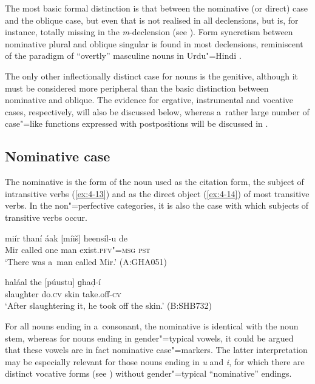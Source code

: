 The most basic formal distinction is that between the nominative (or direct) case and the oblique case, but even that is not realised in all declensions, but is, for instance, totally missing in the \textit{m}-declension (see ). Form syncretism \citep[27]{matthews1991} between nominative plural and oblique singular is found in most declensions, reminiscent of the paradigm of ``overtly'' masculine nouns in Urdu"=Hindi \citep[1]{schmidt1999}.


The only other inflectionally distinct case for nouns is the genitive, although it must be considered more peripheral than the basic distinction between nominative and oblique. The evidence for ergative, instrumental and vocative cases, respectively, will also be discussed below, whereas a~rather large number of case"=like functions expressed with postpositions will be discussed in .


\subsection{Nominative case}
\label{subsec:4-5-1}

The nominative is the form of the noun used as the citation form, the subject of intransitive verbs (\ref{ex:4-13}) and as the direct object (\ref{ex:4-14}) of most transitive verbs. In the non"=perfective categories, it is also the case with which subjects of transitive verbs occur. 


\begin{exe}
\ex
\label{ex:4-13}
\gll miír thaní áak [míiš] heensíl-u de\\
	Mir called one man exist.\textsc{pfv"=msg} \textsc{pst}\\
\glt `There was a~man called Mir.' (A:GHA051)
\end{exe}

\begin{exe}
\ex
\label{ex:4-14}
\gll haláal the [púustu] ɡhaḍ-í \\
	slaughter do.\textsc{cv} skin take.off-\textsc{cv} \\
\glt `After slaughtering it, he took off the skin.' (B:SHB732)
\end{exe}

For all nouns ending in a~consonant, the nominative is identical with the noun stem, whereas for nouns ending in gender"=typical vowels, it could be argued that these vowels are in fact nominative case"=markers. The latter interpretation may be especially relevant for those nouns ending in \textit{u} and \textit{i}, for which there are distinct vocative forms (see ) without gender"=typical ``nominative'' endings.

